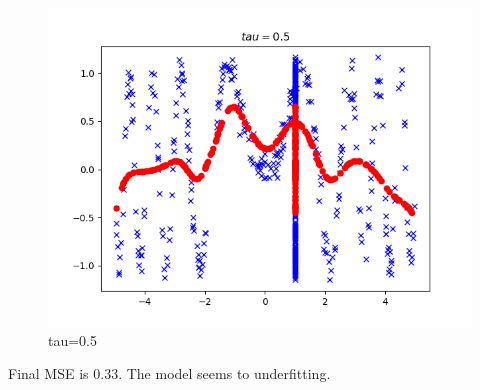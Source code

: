 \begin{answer}

\begin{figure}[htbp]
    \centering
    \includegraphics[width=0.5\linewidth]{pics/tau_0d5.png}
    \caption{tau=0.5}
\end{figure}

Final MSE is $0.33$. The model seems to underfitting.

\end{answer}
